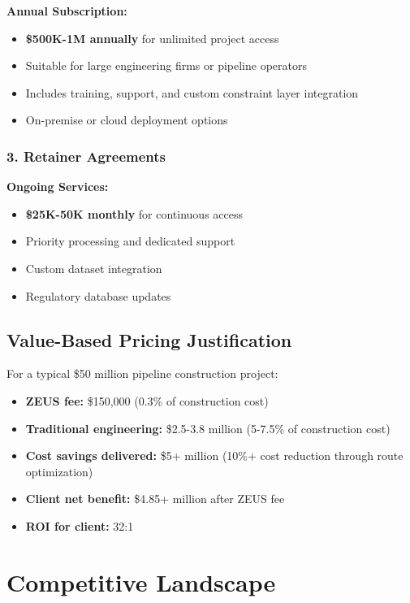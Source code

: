 \documentclass[11pt,letterpaper]{article}
\begin{document}
\textbf{Annual Subscription:}
\begin{itemize}[leftmargin=*]
    \item \textbf{\$500K-1M annually} for unlimited project access
    \item Suitable for large engineering firms or pipeline operators
    \item Includes training, support, and custom constraint layer integration
    \item On-premise or cloud deployment options
\end{itemize}

\subsubsection{3. Retainer Agreements}

\textbf{Ongoing Services:}
\begin{itemize}[leftmargin=*]
    \item \textbf{\$25K-50K monthly} for continuous access
    \item Priority processing and dedicated support
    \item Custom dataset integration
    \item Regulatory database updates
\end{itemize}

\subsection{Value-Based Pricing Justification}

For a typical \$50 million pipeline construction project:
\begin{itemize}[leftmargin=*]
    \item \textbf{ZEUS fee:} \$150,000 (0.3\% of construction cost)
    \item \textbf{Traditional engineering:} \$2.5-3.8 million (5-7.5\% of construction cost)
    \item \textbf{Cost savings delivered:} \$5+ million (10\%+ cost reduction through route optimization)
    \item \textbf{Client net benefit:} \$4.85+ million after ZEUS fee
    \item \textbf{ROI for client:} 32:1
\end{itemize}

\newpage

\section{Competitive Landscape}
\end{document}

